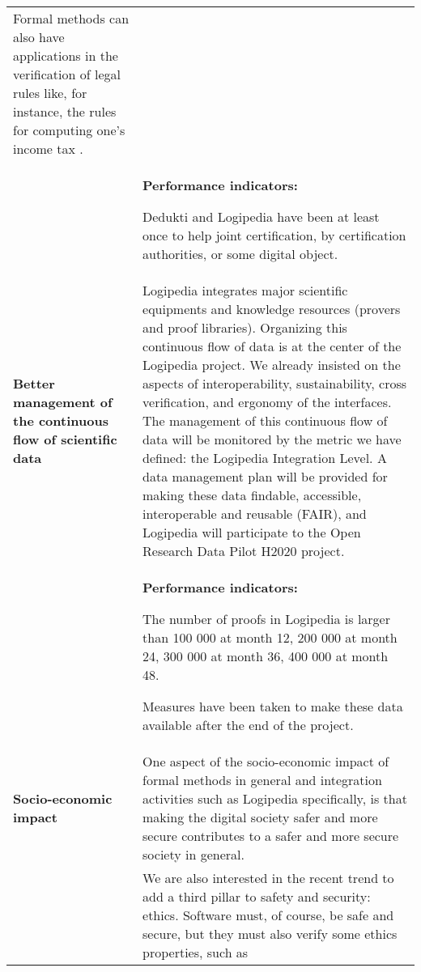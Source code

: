 \begin{longtable}{|p{}|p{}|}
Formal methods can also have applications in the verification of legal
rules like, for instance, the rules for computing one's income tax
\cite{merigoux20jfla}.
\\
&
\colorbox{color2}{\bf Performance indicators:}
\begin{compactitem}
\item Dedukti and Logipedia have been at least once to help joint
certification, by certification authorities, or some digital object.
\end{compactitem}
\\
\hline
{\bf Better management of the continuous flow of scientific data}
&
Logipedia integrates major scientific equipments and knowledge
resources (provers and proof libraries).  Organizing this continuous
flow of data is at the center of the Logipedia project. We already
insisted on the aspects of interoperability, sustainability, cross
verification, and ergonomy of the interfaces.  The management of this
continuous flow of data will be monitored by the metric we have
defined: the Logipedia Integration Level.  A data management plan will
be provided for making these data findable, accessible, interoperable
and reusable (FAIR), and Logipedia will participate to the Open
Research Data Pilot H2020 project.
\\
&
\colorbox{color2}{\bf Performance indicators:}
\begin{compactitem}
\item The number of proofs in Logipedia is larger than 100 000 at month 12,
  200 000 at month 24, 300 000 at month 36, 400 000 at month 48.
\item Measures have been taken to make these data available after the end
  of the project.
\end{compactitem}
\\
\hline
{\bf Socio-economic impact}
&
One aspect of the socio-economic impact of formal methods in general
and integration activities such as Logipedia specifically, is that making the
digital society safer and more secure contributes to a safer and more
secure society in general.\\
&
\hspace{0.4cm} 
We are also interested in the recent trend to add a third pillar to
safety and security: ethics.  Software must, of course, be safe and
secure, but they must also verify some ethics properties, such as

\end{longtable}
